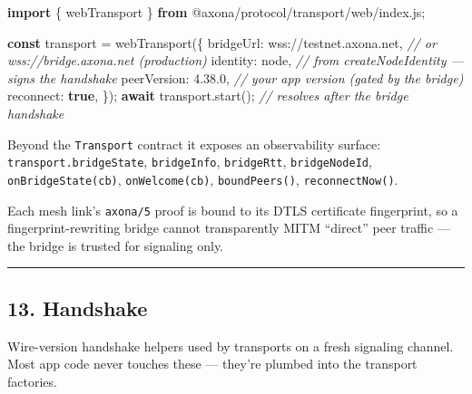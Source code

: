 \documentclass[
  nobib]{tufte-handout}
\newenvironment{Shaded}{}{}
\newcommand{\CommentTok}[1]{\textcolor[rgb]{0.38,0.63,0.69}{\textit{#1}}}
\newcommand{\ControlFlowTok}[1]{\textcolor[rgb]{0.00,0.44,0.13}{\textbf{#1}}}
\newcommand{\DataTypeTok}[1]{\textcolor[rgb]{0.56,0.13,0.00}{#1}}
\newcommand{\FunctionTok}[1]{\textcolor[rgb]{0.02,0.16,0.49}{#1}}
\newcommand{\ImportTok}[1]{\textcolor[rgb]{0.00,0.50,0.00}{\textbf{#1}}}
\newcommand{\KeywordTok}[1]{\textcolor[rgb]{0.00,0.44,0.13}{\textbf{#1}}}
\newcommand{\NormalTok}[1]{#1}
\newcommand{\OperatorTok}[1]{\textcolor[rgb]{0.40,0.40,0.40}{#1}}
\newcommand{\StringTok}[1]{\textcolor[rgb]{0.25,0.44,0.63}{#1}}
\begin{document}
\begin{Shaded}
\begin{Highlighting}[]
\ImportTok{import}\NormalTok{ \{ webTransport \} }\ImportTok{from} \StringTok{\textquotesingle{}@axona/protocol/transport/web/index.js\textquotesingle{}}\OperatorTok{;}

\KeywordTok{const}\NormalTok{ transport }\OperatorTok{=} \FunctionTok{webTransport}\NormalTok{(\{}
  \DataTypeTok{bridgeUrl}\OperatorTok{:}   \StringTok{\textquotesingle{}wss://testnet.axona.net\textquotesingle{}}\OperatorTok{,}  \CommentTok{// or wss://bridge.axona.net (production)}
  \DataTypeTok{identity}\OperatorTok{:}\NormalTok{    node}\OperatorTok{,}                       \CommentTok{// from createNodeIdentity — signs the handshake}
  \DataTypeTok{peerVersion}\OperatorTok{:} \StringTok{\textquotesingle{}4.38.0\textquotesingle{}}\OperatorTok{,}                   \CommentTok{// your app version (gated by the bridge)}
  \DataTypeTok{reconnect}\OperatorTok{:}   \KeywordTok{true}\OperatorTok{,}
\NormalTok{\})}\OperatorTok{;}
\ControlFlowTok{await}\NormalTok{ transport}\OperatorTok{.}\FunctionTok{start}\NormalTok{()}\OperatorTok{;}                  \CommentTok{// resolves after the bridge handshake}
\end{Highlighting}
\end{Shaded}

Beyond the \texttt{Transport} contract it exposes an observability
surface: \texttt{transport.bridgeState}, \texttt{bridgeInfo},
\texttt{bridgeRtt}, \texttt{bridgeNodeId}, \texttt{onBridgeState(cb)},
\texttt{onWelcome(cb)}, \texttt{boundPeers()}, \texttt{reconnectNow()}.

Each mesh link's \texttt{axona/5} proof is bound to its DTLS certificate
fingerprint, so a fingerprint-rewriting bridge cannot transparently MITM
``direct'' peer traffic --- the bridge is trusted for signaling only.

\begin{center}\rule{0.5\linewidth}{0.5pt}\end{center}

\subsection{13. Handshake}\label{handshake}

Wire-version handshake helpers used by transports on a fresh signaling
channel. Most app code never touches these --- they're plumbed into the
transport factories.
\end{document}
